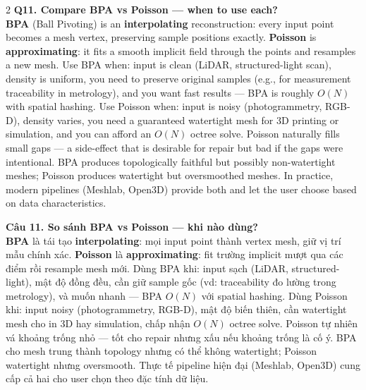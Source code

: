 \begin{paracol}{2}
\textbf{Q11. Compare BPA vs Poisson — when to use each?}\\
\textbf{BPA} (Ball Pivoting) is an \textbf{interpolating} reconstruction: every input point becomes a mesh vertex, preserving sample positions exactly. \textbf{Poisson} is \textbf{approximating}: it fits a smooth implicit field through the points and resamples a new mesh. Use BPA when: input is clean (LiDAR, structured-light scan), density is uniform, you need to preserve original samples (e.g., for measurement traceability in metrology), and you want fast results — BPA is roughly $O(N)$ with spatial hashing. Use Poisson when: input is noisy (photogrammetry, RGB-D), density varies, you need a guaranteed watertight mesh for 3D printing or simulation, and you can afford an $O(N)$ octree solve. Poisson naturally fills small gaps — a side-effect that is desirable for repair but bad if the gaps were intentional. BPA produces topologically faithful but possibly non-watertight meshes; Poisson produces watertight but oversmoothed meshes. In practice, modern pipelines (Meshlab, Open3D) provide both and let the user choose based on data characteristics.

\switchcolumn

\textbf{Câu 11. So sánh BPA vs Poisson — khi nào dùng?}\\
\textbf{BPA} là tái tạo \textbf{interpolating}: mọi input point thành vertex mesh, giữ vị trí mẫu chính xác. \textbf{Poisson} là \textbf{approximating}: fit trường implicit mượt qua các điểm rồi resample mesh mới. Dùng BPA khi: input sạch (LiDAR, structured-light), mật độ đồng đều, cần giữ sample gốc (vd: traceability đo lường trong metrology), và muốn nhanh — BPA $O(N)$ với spatial hashing. Dùng Poisson khi: input noisy (photogrammetry, RGB-D), mật độ biến thiên, cần watertight mesh cho in 3D hay simulation, chấp nhận $O(N)$ octree solve. Poisson tự nhiên vá khoảng trống nhỏ — tốt cho repair nhưng xấu nếu khoảng trống là cố ý. BPA cho mesh trung thành topology nhưng có thể không watertight; Poisson watertight nhưng oversmooth. Thực tế pipeline hiện đại (Meshlab, Open3D) cung cấp cả hai cho user chọn theo đặc tính dữ liệu.

\switchcolumn*


\end{paracol}
